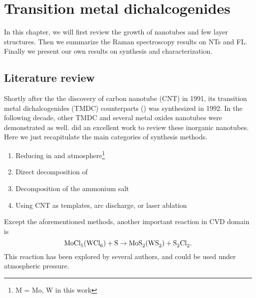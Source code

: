 
\chapter{Transition metal dichalcogenides}

In this chapter, we will first review the growth of  nanotubes and few layer structures. Then we summarize the Raman spectroscopy results on NTs and FL. Finally we present our own results on synthesis and characterization.


\section{Literature review}

Shortly after the the discovery of carbon nanotube (CNT) in 1991,\cite{Iijima1991} its transition metal dichalcogenides (TMDC) counterparts () was synthesized in 1992.\cite{Tenne1992} In the following decade, other TMDC and several metal oxides nanotubes were demonstrated as well. \citeauthor{Rao2003} did an excellent work to review these inorganic nanotubes.\cite{Rao2003} Here we just recapitulate the main categories of synthesis methods.
\begin{enumerate}
\item Reducing  in  and  atmosphere\footnote{M = Mo, W in this work}
\item Direct decomposition of 
\item Decomposition of the ammonium salt 
\item Using CNT as templates, arc discharge, or laser ablation
\end{enumerate}

Except the aforementioned methods, another important reaction in CVD domain is
\begin{equation}\label{eq:mclns}
\cee{MoCl5(WCl6) + S \rightarrow MoS2(WS2) + S2Cl2}.
\end{equation}
This reaction has been explored by several authors,\cite{Stoffels1999} and could be used under atmospheric pressure.\cite{Li2004a}

